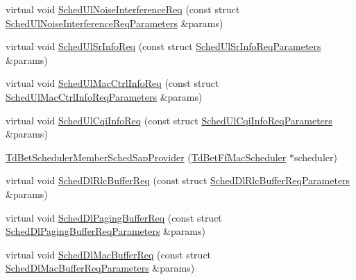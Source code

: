 \begin{DoxyCompactItemize}
\item 
virtual void \hyperlink{classns3_1_1TdBetSchedulerMemberSchedSapProvider_a5ceac388d94470d332bbf43e2e5a94b5}{Sched\+Ul\+Noise\+Interference\+Req} (const struct \hyperlink{structns3_1_1FfMacSchedSapProvider_1_1SchedUlNoiseInterferenceReqParameters}{Sched\+Ul\+Noise\+Interference\+Req\+Parameters} \&params)
\item 
virtual void \hyperlink{classns3_1_1TdBetSchedulerMemberSchedSapProvider_aa80787eacb10cc2c38cd5800967c6dd7}{Sched\+Ul\+Sr\+Info\+Req} (const struct \hyperlink{structns3_1_1FfMacSchedSapProvider_1_1SchedUlSrInfoReqParameters}{Sched\+Ul\+Sr\+Info\+Req\+Parameters} \&params)
\item 
virtual void \hyperlink{classns3_1_1TdBetSchedulerMemberSchedSapProvider_adc2594db46b109b7c4b14e69214f77d3}{Sched\+Ul\+Mac\+Ctrl\+Info\+Req} (const struct \hyperlink{structns3_1_1FfMacSchedSapProvider_1_1SchedUlMacCtrlInfoReqParameters}{Sched\+Ul\+Mac\+Ctrl\+Info\+Req\+Parameters} \&params)
\item 
virtual void \hyperlink{classns3_1_1TdBetSchedulerMemberSchedSapProvider_ae7d0ed0335cb49435c45de9978542119}{Sched\+Ul\+Cqi\+Info\+Req} (const struct \hyperlink{structns3_1_1FfMacSchedSapProvider_1_1SchedUlCqiInfoReqParameters}{Sched\+Ul\+Cqi\+Info\+Req\+Parameters} \&params)
\item 
\hyperlink{classns3_1_1TdBetSchedulerMemberSchedSapProvider_a73777b32c4477119dd54120dbbb42e24}{Td\+Bet\+Scheduler\+Member\+Sched\+Sap\+Provider} (\hyperlink{classns3_1_1TdBetFfMacScheduler}{Td\+Bet\+Ff\+Mac\+Scheduler} $\ast$scheduler)
\item 
virtual void \hyperlink{classns3_1_1TdBetSchedulerMemberSchedSapProvider_a9b02903b6da47b58d48895d70053f919}{Sched\+Dl\+Rlc\+Buffer\+Req} (const struct \hyperlink{structns3_1_1FfMacSchedSapProvider_1_1SchedDlRlcBufferReqParameters}{Sched\+Dl\+Rlc\+Buffer\+Req\+Parameters} \&params)
\item 
virtual void \hyperlink{classns3_1_1TdBetSchedulerMemberSchedSapProvider_a7cdd97d54fd4163b4c0b74b93e68f3a0}{Sched\+Dl\+Paging\+Buffer\+Req} (const struct \hyperlink{structns3_1_1FfMacSchedSapProvider_1_1SchedDlPagingBufferReqParameters}{Sched\+Dl\+Paging\+Buffer\+Req\+Parameters} \&params)
\item 
virtual void \hyperlink{classns3_1_1TdBetSchedulerMemberSchedSapProvider_a91e865e7d8770736b5c445e985d4071e}{Sched\+Dl\+Mac\+Buffer\+Req} (const struct \hyperlink{structns3_1_1FfMacSchedSapProvider_1_1SchedDlMacBufferReqParameters}{Sched\+Dl\+Mac\+Buffer\+Req\+Parameters} \&params)

\end{DoxyCompactItemize}
